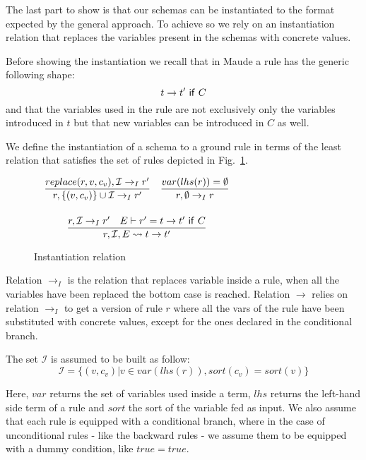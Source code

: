 \documentclass{article}[12pt,a4paper]
\theoremstyle{definition}
\begin{document}
The last part to show is that our schemas can be instantiated to the format
expected by the general approach. To achieve so we rely on an instantiation
relation that replaces the variables present in the schemas with concrete values.

Before showing the instantiation we recall that in Maude a rule has the generic
following shape:
\[t \rightarrow t'~\mathsf{if}~C\]
and that the variables used in the rule are not exclusively only the variables
introduced in $t$ but that new variables can be introduced in $C$ as well.

We define the instantiation of a schema to a ground rule in terms of the least
relation that satisfies the set of rules depicted in Fig.~\ref{fig:inst}.

\begin{figure}
  \centering
  $
  \begin{array}{c}
  \begin{array}{ll}
      \displaystyle
      \frac{replace(r,v,c_v),\mathcal{I}\rightarrow_I r'}
      {r, \{(v,c_v)\}\cup\mathcal{I} \rightarrow_I r'}
    &
      \displaystyle
      \frac{var(lhs(r))=\emptyset}
      {r,\emptyset \rightarrow_I r}
  \end{array}\\[5ex]

  \begin{array}{c}
    \displaystyle
    \frac{r,\mathcal{I}\rightarrow_I r'~~~E\vdash r'=t\rightarrow t'~\ms{if}~C}
    {r, \mathcal{I},E \rightsquigarrow t\rightarrow t'}
  \end{array}
  \end{array}
  $
  \caption{Instantiation relation}
  \label{fig:inst}
\end{figure}

Relation $\rightarrow_I$ is the relation that replaces variable inside a rule,
when all the variables have been replaced the bottom case is reached. Relation
$\rightarrow$ relies on relation $\rightarrow_I$ to get a version of rule $r$
where all the vars of the rule have been substituted with concrete values,
except for the ones declared in the conditional branch.

The set $\mathcal{I}$ is assumed to be built as follow:
\[\mathcal{I}=\{(v,c_v)|v\in var(lhs(r)), sort(c_v)= sort(v)\}\]

Here, $var$ returns the set of variables used inside a term, $lhs$ returns
the left-hand side term of a rule and $sort$ the sort of the variable fed as
input.
We also assume that each rule is equipped with a conditional branch, where in
the case of unconditional rules - like the backward rules - we assume them to be
equipped with a dummy condition, like $true = true$.
\end{document}
